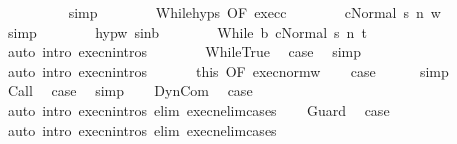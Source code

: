 \begin{isabellebody}
\ \ \ \ \ \ \ \ \isamarkupfalse%
\ simp\isanewline
\ \ \ \ \ \ \isamarkupfalse%
\ While{\isachardot}hyps\ {\isacharbrackleft}OF\ exec{\isacharunderscore}c{\isacharbrackright}\isanewline
\ \ \ \ \ \ \isamarkupfalse%
\ {\isachardoublequoteopen}{\isasymGamma}{\isasymturnstile}{\isasymlangle}c{\isacharcomma}Normal\ s{\isasymrangle}\ {\isacharequal}n{\isasymRightarrow}\ w{\isachardoublequoteclose}\isanewline
\ \ \ \ \ \ \ \ \isamarkupfalse%
\ simp\isanewline
\ \ \ \ \ \ \isamarkupfalse%
\ hyp{\isacharunderscore}w\ s{\isacharunderscore}in{\isacharunderscore}b\isanewline
\ \ \ \ \ \ \isamarkupfalse%
\ {\isachardoublequoteopen}{\isasymGamma}{\isasymturnstile}{\isasymlangle}While\ b\ c{\isacharcomma}Normal\ s{\isasymrangle}\ {\isacharequal}n{\isasymRightarrow}\ t{\isachardoublequoteclose}\isanewline
\ \ \ \ \ \ \ \ \isamarkupfalse%
\ {\isacharparenleft}auto\ intro{\isacharcolon}\ execn{\isachardot}intros{\isacharparenright}\isanewline
\ \ \ \ \ \ \isamarkupfalse%
\ WhileTrue\ \isamarkupfalse%
\ {\isacharquery}case\ \isamarkupfalse%
\ simp\isanewline
\ \ \ \ \isamarkupfalse%
\ {\isacharparenleft}auto\ intro{\isacharcolon}\ execn{\isachardot}intros{\isacharparenright}\isanewline
\ \ \isacommand{{\isacharbraceright}}\isamarkupfalse%
\isanewline
\ \ \isamarkupfalse%
\ this\ {\isacharbrackleft}OF\ exec{\isacharunderscore}norm{\isacharunderscore}w{\isacharbrackright}\isanewline
\ \ \isamarkupfalse%
\ {\isacharquery}case\isanewline
\ \ \ \ \isamarkupfalse%
\ simp\isanewline
{}\isamarkupfalse%
\isanewline
\ \ \isamarkupfalse%
\ Call\ \isamarkupfalse%
\ {\isacharquery}case\ \isamarkupfalse%
\ simp\isanewline
{}\isamarkupfalse%
\isanewline
\ \ \isamarkupfalse%
\ DynCom\ \isamarkupfalse%
\ {\isacharquery}case\ \isamarkupfalse%
\ {\isacharparenleft}auto\ intro{\isacharcolon}\ execn{\isachardot}intros\ elim{\isacharbang}{\isacharcolon}\ execn{\isacharunderscore}elim{\isacharunderscore}cases{\isacharparenright}\isanewline
{}\isamarkupfalse%
\isanewline
\ \ \isamarkupfalse%
\ Guard\ \isamarkupfalse%
\ {\isacharquery}case\ \isamarkupfalse%
\ {\isacharparenleft}auto\ intro{\isacharcolon}\ execn{\isachardot}intros\ elim{\isacharbang}{\isacharcolon}\ execn{\isacharunderscore}elim{\isacharunderscore}cases{\isacharparenright}\isanewline

\end{isabellebody}
